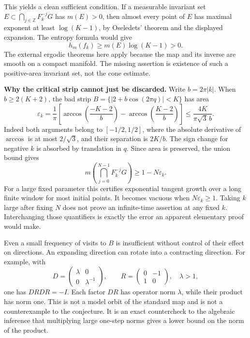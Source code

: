 \documentclass[11pt]{article}
\begin{document}
This yields a clean sufficient condition.  If a measurable invariant set
$E\subset\bigcap_{j\in\mathbb Z}F_k^{-j}G$ has $m(E)>0$, then almost every
point of $E$ has maximal exponent at least $\log(K-1)$, by Oseledets' theorem
and the displayed expansion.  The entropy formula would give
\[
 h_m(f_k)\geq m(E)\log(K-1)>0.
\]
The external ergodic theorems here apply because the map and its inverse are
smooth on a compact manifold.  The missing assertion is existence of such a
positive-area invariant set, not the cone estimate.

\textbf{Why the critical strip cannot just be discarded.}
Write $b=2\pi|k|$.  When $b\geq2(K+2)$, the bad strip
$B=\{|2+b\cos(2\pi q)|<K\}$ has area
\[
 \varepsilon_k=\frac1\pi\left[
 \arccos\!\left(\frac{-K-2}{b}\right)
 -\arccos\!\left(\frac{K-2}{b}\right)\right]
 \leq\frac{4K}{\pi\sqrt3\,b}.
\]
Indeed both arguments belong to $[-1/2,1/2]$, where the absolute derivative
of $\arccos$ is at most $2/\sqrt3$, and their separation is $2K/b$.
The sign change for negative $k$ is absorbed by translation in $q$.
Since area is preserved, the union bound gives
\[
 m\left(\bigcap_{j=0}^{N-1}F_k^{-j}G\right)
 \geq 1-N\varepsilon_k.
\]
For a large fixed parameter this certifies exponential tangent growth over a
long finite window for most initial points.  It becomes vacuous when
$N\varepsilon_k\geq1$.  Taking $k$ large after fixing $N$ does not prove an
infinite-time assertion at any fixed $k$.  Interchanging those quantifiers is
exactly the error an apparent elementary proof would make.

Even a small frequency of visits to $B$ is insufficient without control of
their effect on directions.  An expanding direction can rotate into a
contracting direction.  For example, with
\[
 D=\begin{pmatrix}\lambda&0\\0&\lambda^{-1}\end{pmatrix},\qquad
 R=\begin{pmatrix}0&-1\\1&0\end{pmatrix},\quad\lambda>1,
\]
one has $DRDR=-I$.  Each factor $DR$ has operator norm $\lambda$, while their
product has norm one.  This is not a model orbit of the standard map and is
not a counterexample to the conjecture.  It is an exact countercheck to the
algebraic inference that multiplying large one-step norms gives a lower bound
on the norm of the product.
\end{document}
